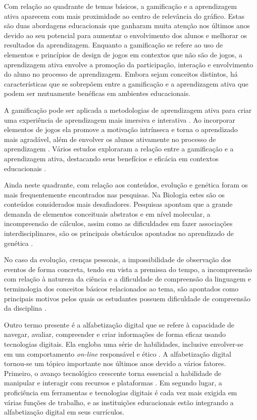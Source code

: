 \documentclass[portuguese]{textolivre}
\begin{document}
Com relação ao quadrante de temas básicos, a gamificação e a aprendizagem ativa aparecem com mais proximidade ao centro de relevância do gráfico. Estas são duas abordagens educacionais que ganharam muita atenção nos últimos anos devido ao seu potencial para aumentar o envolvimento dos alunos e melhorar os resultados da aprendizagem. Enquanto a gamificação se refere ao uso de elementos e princípios de design de jogos em contextos que não são de jogos, a aprendizagem ativa envolve a promoção da participação, interação e envolvimento do aluno no processo de aprendizagem. Embora sejam conceitos distintos, há características que se sobrepõem entre a gamificação e a aprendizagem ativa que podem ser mutuamente benéficas em ambientes educacionais.

A gamificação pode ser aplicada a metodologias de aprendizagem ativa para criar uma experiência de aprendizagem mais imersiva e interativa \cite{jones_kahoot!_2019}. Ao incorporar elementos de jogos ela promove a motivação intrínseca e torna o aprendizado mais agradável, além de envolver os alunos ativamente no processo de aprendizagem \cite{subhash_gamified_2018}. Vários estudos exploraram a relação entre a gamificação e a aprendizagem ativa, destacando seus benefícios e eficácia em contextos educacionais \cite{murillo-zamorano_gamification_2021,seaborn_gamification_2015,subhash_gamified_2018}.

Ainda neste quadrante, com relação aos conteúdos, evolução e genética foram os mais frequentemente encontrados nas pesquisas. Na Biologia estes são os conteúdos considerados mais desafiadores. Pesquisas apontam que a grande demanda de elementos conceituais abstratos e em nível molecular, a incompreensão de cálculos, assim como as dificuldades em fazer associações interdisciplinares, são os principais obstáculos apontados no aprendizado de genética \cite{fabricio_compreensao_2006,catarinacho_o_2011}.

No caso da evolução, crenças pessoais, a impossibilidade de observação dos eventos de forma concreta, tendo em vista a premissa do tempo, a incompreensão com relação à natureza da ciência e a dificuldade de compreensão da linguagem e terminologia dos conceitos básicos relacionados ao tema, são apontados como principais motivos pelos quais os estudantes possuem dificuldade de compreensão da disciplina \cite{gregory_understanding_2009,sinatra_intentions_2003,rutledge_evolutionary_2000}.

Outro termo presente é a alfabetização digital que se refere à capacidade de navegar, avaliar, compreender e criar informações de forma eficaz usando tecnologias digitais. Ela engloba uma série de habilidades, inclusive envolver-se em um comportamento \textit{on-line} responsável e ético \cite{livingstone_balancing_2010}. A alfabetização digital tornou-se um tópico importante nos últimos anos devido a vários fatores. Primeiro, o avanço tecnológico crescente torna essencial a habilidade de manipular e interagir com recursos e plataformas \cite{koltay_media_2011}. Em segundo lugar, a proficiência em ferramentas e tecnologias digitais é cada vez mais exigida em várias funções de trabalho, e as instituições educacionais estão integrando a alfabetização digital em seus currículos.
\end{document}
